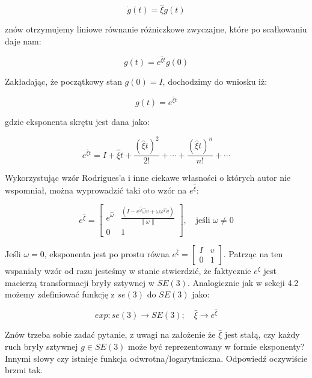 \documentclass[a4paper,12pt]{article}
\begin{document}
\begin{equation}
\dot{g}(t) = \hat{\xi}g(t)
\end{equation}

\noindent znów otrzymujemy liniowe równanie różniczkowe zwyczajne, które po scałkowaniu daje nam:

\begin{equation}
g(t)=e^{\hat{\xi}t}g(0)
\end{equation}

\noindent Zakładając, że początkowy stan $g(0)=I$, dochodzimy do wniosku iż:

\begin{equation}
g(t) = e^{\hat{\xi}t}
\end{equation}

\noindent gdzie eksponenta skrętu jest dana jako:

\begin{equation}
e^{\hat{\xi}t} = I + \hat{\xi}t + \frac{(\hat{\xi}t)^2}{2!} + \cdots + \frac{(\hat{\xi}t)^n}{n!} + \cdots
\end{equation}

Wykorzystując wzór Rodrigues'a i inne ciekawe własności o których autor nie wspomniał, można wyprowadzić taki oto wzór na $e^{\hat{\xi}}$:

\begin{equation}
e^{\hat{\xi}}=\begin{bmatrix} e^{\hat{\omega}} & \frac{(I-e^{\hat{\omega}}\hat{\omega}v+\omega\omega^Tv)}{\| \omega \|} \\ 0 & 1 \end{bmatrix}, \quad \text{jeśli } \omega \neq 0
\end{equation}

\noindent Jeśli $\omega=0$, eksponenta jest po prostu równa $e^{\hat{\xi}}=\begin{bmatrix} I & v \\ 0 & 1 \end{bmatrix}$. Patrząc na ten wspaniały wzór od razu jesteśmy w stanie stwierdzić, że faktycznie $e^{\xi}$ jest macierzą transformacji bryły sztywnej w $SE(3)$. Analogicznie jak w sekcji 4.2 możemy zdefiniować funkcję z $se(3)$ do $SE(3)$ jako:

\begin{equation}
exp: se(3) \rightarrow SE(3); \quad \hat{\xi} \rightarrow e^{\hat{\xi}}
\end{equation}

Znów trzeba sobie zadać pytanie, z uwagi na założenie że $\hat{\xi}$ jest stałą, czy każdy ruch bryły sztywnej $g \in SE(3)$ może być reprezentowany w formie eksponenty? Innymi słowy czy istnieje funkcja odwrotna/logarytmiczna. Odpowiedź oczywiście brzmi tak.
\end{document}
